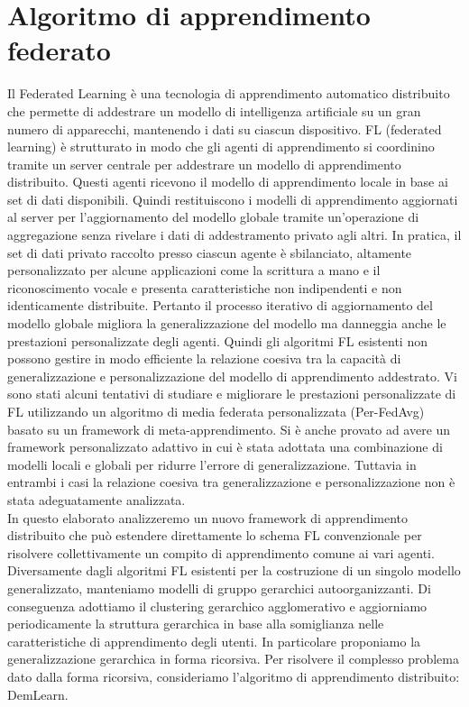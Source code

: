 \chapter{Algoritmo di apprendimento federato}\label{ch:chapter1}
Il Federated Learning è una tecnologia di apprendimento automatico distribuito che permette di addestrare un modello di intelligenza artificiale su un gran numero di apparecchi, mantenendo i dati su ciascun dispositivo.
FL (federated learning) è strutturato in modo che gli agenti di apprendimento si coordinino tramite un server centrale per addestrare un modello di apprendimento distribuito. Questi agenti ricevono il modello di apprendimento locale in base ai set di dati disponibili. Quindi restituiscono i modelli di apprendimento aggiornati al server per l'aggiornamento del modello globale tramite un'operazione di aggregazione senza rivelare i dati di addestramento privato agli altri. In pratica, il set di dati privato raccolto presso ciascun agente è sbilanciato, altamente personalizzato per alcune applicazioni come la scrittura a mano e il riconoscimento vocale e presenta caratteristiche non indipendenti e non identicamente distribuite. Pertanto il processo iterativo di aggiornamento del modello globale migliora la generalizzazione del modello ma danneggia anche le prestazioni personalizzate degli agenti. Quindi gli algoritmi FL esistenti non possono gestire in modo efficiente la relazione coesiva tra la capacità di generalizzazione e personalizzazione del modello di apprendimento addestrato. Vi sono stati alcuni tentativi di studiare e migliorare le prestazioni personalizzate di FL utilizzando un algoritmo di media federata personalizzata (Per-FedAvg) basato su un framework di meta-apprendimento. Si è anche provato ad avere un framework personalizzato adattivo in cui è stata adottata una combinazione di modelli locali e globali per ridurre l'errore di generalizzazione. Tuttavia in entrambi i casi la relazione coesiva tra generalizzazione e personalizzazione non è stata adeguatamente analizzata.\\
In questo elaborato analizzeremo un nuovo framework di apprendimento distribuito che può estendere direttamente lo schema FL convenzionale per risolvere collettivamente un compito di apprendimento comune ai vari agenti. Diversamente dagli algoritmi FL esistenti per la costruzione di un singolo modello generalizzato, manteniamo modelli di gruppo gerarchici autoorganizzanti. Di conseguenza adottiamo il clustering gerarchico agglomerativo e aggiorniamo periodicamente la struttura gerarchica in base alla somiglianza nelle caratteristiche di apprendimento degli utenti. In particolare proponiamo la generalizzazione gerarchica in forma ricorsiva. Per risolvere il complesso problema dato dalla forma ricorsiva, consideriamo  l'algoritmo di apprendimento distribuito: DemLearn. 